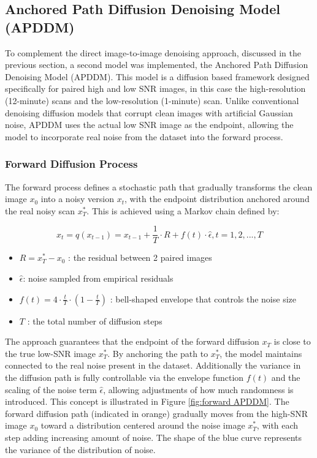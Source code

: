 \documentclass[twocolumn]{article}
\begin{document}
\subsection{Anchored Path Diffusion Denoising Model (APDDM)}
To complement the direct image-to-image denoising approach, discussed in the previous section, a second model was implemented, 
the Anchored Path Diffusion Denoising Model (APDDM). 
This model is a diffusion based framework designed specifically for paired high and low SNR images, in this case the high-resolution (12-minute) scans and the low-resolution (1-minute) scan. Unlike conventional denoising diffusion models that corrupt clean images with artificial Gaussian noise, APDDM uses the actual low SNR image as the endpoint, allowing the model to incorporate real noise from the dataset into the forward process. 

\subsubsection{Forward Diffusion Process}
The forward process defines a stochastic path that gradually transforms the clean image $x_0$ into a noisy version $x_t$, with the endpoint distribution anchored around the real noisy scan $x_T^*$. 
This is achieved using a Markov chain defined by:

\begin{equation}\label{eq:Markov chain}
x_t=q(x_{t-1})=x_{t-1}+\frac{1}{T}\cdot R+f(t)\cdot \hat{\epsilon}, t=1,2,...,T
\end{equation}
\begin{itemize}
    \item $R=x_T^*-x_0$ : the residual between 2 paired images
    \item $\hat{\epsilon} $: noise sampled from empirical residuals
    \item $f(t)=4 \cdot \frac{t}{T} \cdot (1-\frac{t}{T})$ : bell-shaped envelope that controls the noise size
    \item $T$ : the total number of diffusion steps
\end{itemize}


The approach guarantees that the endpoint of the forward diffusion $x_T$ is close to the true low-SNR image $x_T^*$. 
By anchoring the path to $x_T^*$, the model maintains connected to the real noise present in the dataset. 
Additionally the variance in the diffusion path is fully controllable via the envelope function $f(t)$ and the scaling of the noise term $\hat{\epsilon} $, allowing adjustments of how much randomness is introduced. 
This concept is illustrated in Figure \ref{fig:forward APDDM}. The forward diffusion path (indicated in orange) gradually moves from the high-SNR image $x_0$ toward a distribution centered around the noise image $x_T^*$, with each step adding increasing amount of noise. 
The shape of the blue curve represents the variance of the distribution of noise.
\end{document}
